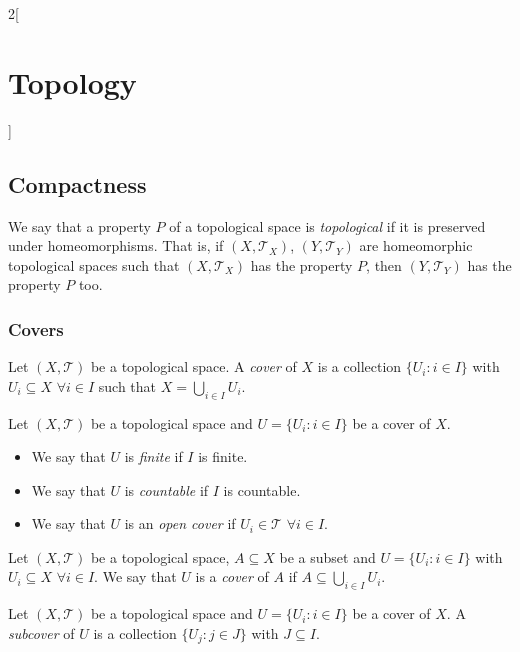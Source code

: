 \documentclass[../../../main.tex]{subfiles}
\begin{document}
\begin{multicols}{2}[\section{Topology}]
  \subsection{Compactness}
  \begin{definition}
    We say that a property $P$ of a topological space is \textit{topological} if it is preserved under homeomorphisms. That is, if $(X,\mathcal{T}_X)$, $(Y,\mathcal{T}_Y)$ are homeomorphic topological spaces such that $(X,\mathcal{T}_X)$ has the property $P$, then $(Y,\mathcal{T}_Y)$ has the property $P$ too.
  \end{definition}
  \subsubsection{Covers}
  \begin{definition}[Cover]
    Let $(X,\mathcal{T})$ be a topological space. A \textit{cover} of $X$ is a collection $\{U_i:i\in I\}$ with $U_i\subseteq X$ $\forall i\in I$ such that $X=\bigcup_{i\in I}U_i$.
  \end{definition}
  \begin{definition}
    Let $(X,\mathcal{T})$ be a topological space and $U=\{U_i:i\in I\}$ be a cover of $X$.
    \begin{itemize}
      \item We say that $U$ is \textit{finite} if $I$ is finite.
      \item We say that $U$ is \textit{countable} if $I$ is countable.
      \item We say that $U$ is an \textit{open cover} if $U_i\in\mathcal{T}$ $\forall i\in I$.
    \end{itemize}
  \end{definition}
  \begin{definition}
    Let $(X,\mathcal{T})$ be a topological space, $A\subseteq X$ be a subset and $U=\{U_i:i\in I\}$ with $U_i\subseteq X$ $\forall i\in I$. We say that $U$ is a \textit{cover} of $A$ if $A\subseteq\bigcup_{i\in I}U_i$.
  \end{definition}
  \begin{definition}
    Let $(X,\mathcal{T})$ be a topological space and $U=\{U_i:i\in I\}$ be a cover of $X$. A \textit{subcover} of $U$ is a collection $\{U_j:j\in J\}$ with $J\subseteq I$.
  \end{definition}

\end{multicols}
\end{document}
